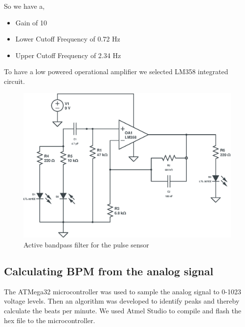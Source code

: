 \documentclass[12pt]{article}
\begin{document}
	
	
	
	
	So we have a,

		\begin{itemize}
			\item Gain of 10
			\item Lower Cutoff Frequency of 0.72 Hz
			\item Upper Cutoff Frequency of 2.34 Hz\\
		  \end{itemize}
		 To have a low powered operational amplifier we selected LM358 integrated circuit.
	
		\begin{figure}[!htbp]
			\includegraphics[width=\textwidth]{LM358-Bandpass}
			\caption{Active bandpass filter for the pulse sensor}
		\end{figure}
	
		\clearpage
	\subsection{Calculating BPM from the analog signal}
	The ATMega32 microcontroller was used to sample the analog signal to 0-1023 voltage levels. Then an algorithm was developed to identify peaks and thereby calculate the beats per minute. We used Atmel Studio to compile and flash the hex file to the microcontroller. 
\end{document}
